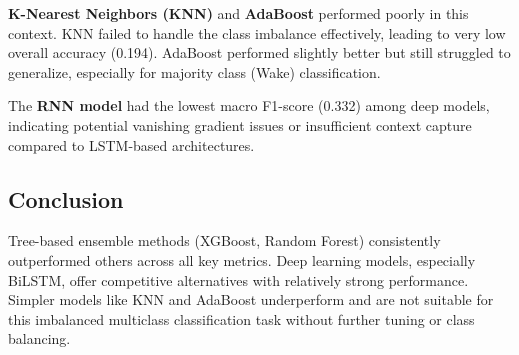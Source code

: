 \textbf{K-Nearest Neighbors (KNN)} and \textbf{AdaBoost} performed poorly in this context. KNN failed to handle the class imbalance effectively, leading to very low overall accuracy (0.194). AdaBoost performed slightly better but still struggled to generalize, especially for majority class (Wake) classification.

The \textbf{RNN model} had the lowest macro F1-score (0.332) among deep models, indicating potential vanishing gradient issues or insufficient context capture compared to LSTM-based architectures.

\subsection{Conclusion}

Tree-based ensemble methods (XGBoost, Random Forest) consistently outperformed others across all key metrics. Deep learning models, especially BiLSTM, offer competitive alternatives with relatively strong performance. Simpler models like KNN and AdaBoost underperform and are not suitable for this imbalanced multiclass classification task without further tuning or class balancing.



